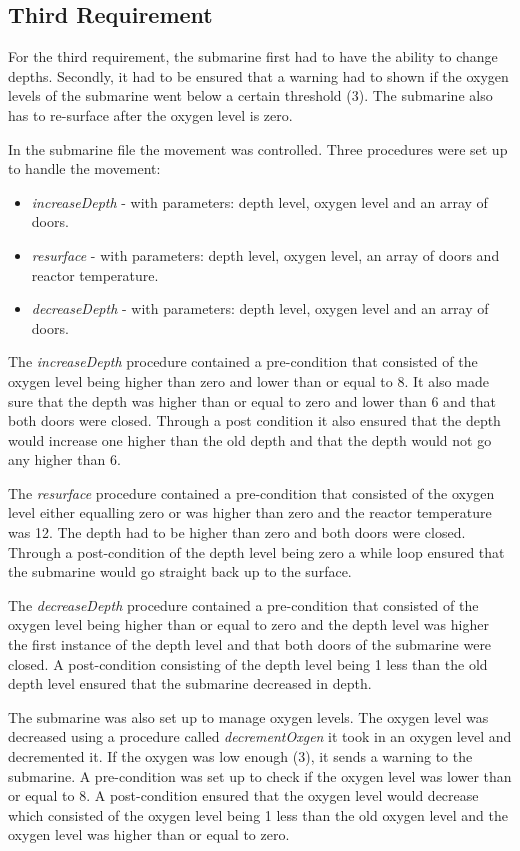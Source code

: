 \subsection{Third Requirement}
For the third requirement, the submarine first had to have the ability to change depths. Secondly, it had to be ensured that a warning had to shown if the oxygen levels of the submarine went below a certain threshold (3). The submarine also has to re-surface after the oxygen level is zero.  

In the submarine file the movement was controlled. Three procedures were set up to handle the movement:
\begin{itemize}
	\item \textit{increaseDepth} - with parameters: depth level, oxygen level and an array of doors.
	\item \textit{resurface} - with parameters: depth level, oxygen level, an array of doors and reactor temperature.
	\item \textit{decreaseDepth} - with parameters: depth level, oxygen level and an array of doors.
\end{itemize}

The \textit{increaseDepth} procedure contained a pre-condition that consisted of the oxygen level being higher than zero and lower than or equal to 8. It also made sure that the depth was higher than or equal to zero and lower than 6 and that both doors were closed. Through a post condition it also ensured that the depth would increase one higher than the old depth and that the depth would not go any higher than 6.

The \textit{resurface} procedure contained a pre-condition that consisted of the oxygen level either equalling zero or was higher than zero and the reactor temperature was 12. The depth had to be higher than zero and both doors were closed. Through a post-condition of the depth level being zero a while loop ensured that the submarine would go straight back up to the surface.

The \textit{decreaseDepth} procedure contained a pre-condition that consisted of the oxygen level being higher than or equal to zero and the depth level was higher the first instance of the depth level and that both doors of the submarine were closed. A post-condition consisting of the depth level being 1 less than the old depth level ensured that the submarine decreased in depth. 

The submarine was also set up to manage oxygen levels. The oxygen level was decreased using a procedure called \textit{decrementOxgen} it took in an oxygen level and decremented it. If the oxygen was low enough (3), it sends a warning to the submarine. A pre-condition was set up to check if the oxygen level was lower than or equal to 8. A post-condition ensured that the oxygen level would decrease which consisted of the oxygen level being 1 less than the old oxygen level and the oxygen level was higher than or equal to zero.


